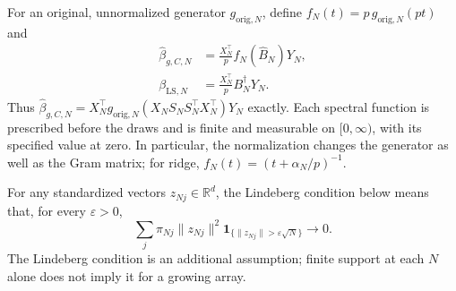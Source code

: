 \documentclass[pdflatex,iicol,sn-mathphys-ay]{sn-jnl}
\theoremstyle{thmstyleone}
\theoremstyle{thmstylethree}
\theoremstyle{thmstyletwo}
\begin{document}
For an original, unnormalized generator \(g_{\mathrm{orig},N}\), define
$f_N(t)=p\,g_{\mathrm{orig},N}(pt)$ and
\begin{equation*}
 \begin{aligned}
 \widehat\beta_{g,C,N}&=\frac{X_N^\top}{p}f_N(\widehat B_N)Y_N,\\
 \beta_{\mathrm{LS},N}&=\frac{X_N^\top}{p}B_N^\dagger Y_N.
 \end{aligned}
\end{equation*}
Thus \(\widehat\beta_{g,C,N}=X_N^\top
g_{\mathrm{orig},N}(X_NS_NS_N^\top X_N^\top)Y_N\) exactly.
Each spectral function is prescribed before the draws and is finite and
measurable on \([0,\infty)\), with its specified value at zero.
In particular, the normalization changes the generator as well as the Gram
matrix; for ridge, \(f_N(t)=(t+\alpha_N/p)^{-1}\).

For any standardized vectors \(z_{Nj}\in\mathbb R^d\), the Lindeberg
condition below means that, for every $\varepsilon>0$,
\begin{equation}
 \sum_j\pi_{Nj}\|z_{Nj}\|^2
 \mathbf{1}_{\{\|z_{Nj}\|>\varepsilon\sqrt N\}}\longrightarrow0.
 \label{eq:array_lindeberg}
\end{equation}
The Lindeberg condition is an additional assumption; finite support at each
\(N\) alone does not imply it for a growing array.
\end{document}
